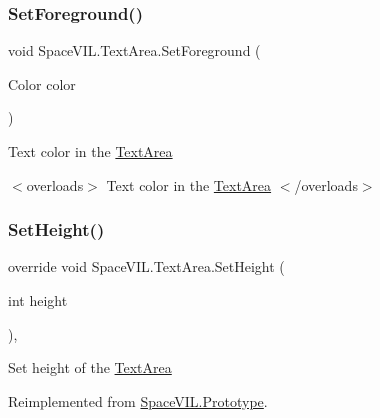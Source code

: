 \subsubsection{\texorpdfstring{Set\+Foreground()}{SetForeground()}}
{\footnotesize\ttfamily void Space\+V\+I\+L.\+Text\+Area.\+Set\+Foreground (\begin{DoxyParamCaption}\item[{Color}]{color }\end{DoxyParamCaption})\hspace{0.3cm}{\ttfamily [inline]}}



Text color in the \mbox{\hyperlink{class_space_v_i_l_1_1_text_area}{Text\+Area}} 

$<$overloads$>$ Text color in the \mbox{\hyperlink{class_space_v_i_l_1_1_text_area}{Text\+Area}} $<$/overloads$>$ \mbox{\label{class_space_v_i_l_1_1_text_area_abb58c3f9396680f5d2c7f238c0d6e0bb}} 
\subsubsection{\texorpdfstring{Set\+Height()}{SetHeight()}}
{\footnotesize\ttfamily override void Space\+V\+I\+L.\+Text\+Area.\+Set\+Height (\begin{DoxyParamCaption}\item[{int}]{height }\end{DoxyParamCaption})\hspace{0.3cm}{\ttfamily [inline]}, {\ttfamily [virtual]}}



Set height of the \mbox{\hyperlink{class_space_v_i_l_1_1_text_area}{Text\+Area}} 



Reimplemented from \mbox{\hyperlink{class_space_v_i_l_1_1_prototype_adc0adcbd1c3800d9525798ba7be5832a}{Space\+V\+I\+L.\+Prototype}}.

\mbox{\label{class_space_v_i_l_1_1_text_area_a133db6e0dc1fccf3e92d4044d9a16df0}} 
